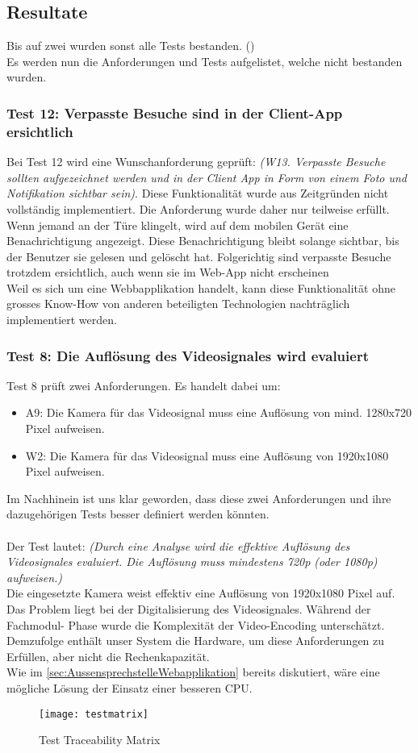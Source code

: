 \subsection{Resultate}
Bis auf zwei wurden sonst alle Tests bestanden. ()
\\
Es werden nun die Anforderungen und Tests aufgelistet, welche nicht bestanden wurden.

\subsubsection{Test 12: Verpasste Besuche sind in der Client-App ersichtlich}
Bei Test 12 wird eine Wunschanforderung geprüft: \textit{(W13. Verpasste Besuche sollten
aufgezeichnet werden und in der Client App in Form von einem Foto und Notifikation
sichtbar sein)}. Diese Funktionalität wurde aus Zeitgründen nicht vollständig implementiert. Die Anforderung wurde daher nur teilweise erfüllt. Wenn jemand an der Türe klingelt, wird auf dem mobilen Gerät eine Benachrichtigung angezeigt. Diese Benachrichtigung bleibt solange sichtbar, bis der Benutzer sie gelesen und gelöscht hat. Folgerichtig sind verpasste Besuche trotzdem ersichtlich, auch wenn sie im Web-App nicht erscheinen
\\
Weil es sich um eine Webbapplikation handelt, kann diese Funktionalität ohne grosses Know-How von anderen beteiligten Technologien nachträglich implementiert werden.

\subsubsection{Test 8: Die Auflösung des Videosignales wird evaluiert}
Test 8 prüft zwei Anforderungen. Es handelt dabei um:
\begin{itemize}
	\item A9: Die Kamera für das Videosignal muss eine Auflösung von mind. 1280x720
	Pixel aufweisen. 
	\item W2: Die Kamera für das Videosignal muss eine Auflösung von 1920x1080
	Pixel aufweisen. 
\end{itemize}
Im Nachhinein ist uns klar geworden, dass diese zwei Anforderungen und ihre
dazugehörigen Tests besser definiert werden könnten.
\\
\\
Der Test lautet: \textit{(Durch eine Analyse wird die effektive Auflösung des Videosignales evaluiert. Die Auflösung muss mindestens 720p (oder 1080p) aufweisen.)}
\\
Die eingesetzte Kamera weist effektiv eine Auflösung von 1920x1080 Pixel auf. Das
Problem liegt bei der Digitalisierung des Videosignales. Während der Fachmodul-
Phase wurde die Komplexität der Video-Encoding unterschätzt.
\\
Demzufolge enthält unser System die Hardware, um diese Anforderungen zu
Erfüllen, aber nicht die Rechenkapazität.
\\
Wie im \cref{sec:AussensprechstelleWebapplikation} bereits diskutiert, wäre eine mögliche Lösung der Einsatz einer besseren CPU.

\begin{figure}[htb!]
	\begin{center}
		\texttt{[image: testmatrix]}
		\caption[Test-Traceability Matrix]{Test Traceability Matrix}
		\label{fig:testmatrix}
	\end{center}
\end{figure}

\newpage